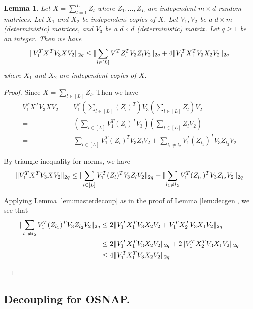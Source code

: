 \documentclass[11pt]{amsart}
\numberwithin{equation}{section}
\numberwithin{equation}{section}
\DeclarePairedDelimiter{\norm}{\lVert}{\rVert}
\newtheorem{lemma}[theorem]{Lemma}
\begin{document}
\begin{lemma}\label{decgeneral}
    Let $X=\sum \limits_{l=1}^L Z_l$ where $Z_1,...,Z_L$ are independent $m \times d$ random matrices.
 Let $X_1$ and $X_2$ be independent copies of $X$. Let $V_1,V_2$ be a $d \times m$ (deterministic) matrices, and $V_3$ be a $d \times d$ (deterministic) matrix. Let $q \ge 1$ be an integer. Then we have
    \begin{align*}
        \norm{V_1^TX^TV_3XV_2}_{2q} \le \norm{\sum \limits_{l \in [L]}V_1^TZ_{l}^TV_3Z_{l}V_2}_{2q}+4\norm{V_1^TX_1^TV_3X_2V_2}_{2q}
    \end{align*}
    where $X_1$ and $X_2$ are independent copies of $X$.
\end{lemma}

\begin{proof}
Since $X=\sum \limits_{l \in [L]}Z_l$. Then we have
\begin{align*}
    V_1^TX^TV_3XV_2=&V_1^T(\sum \limits_{l \in [L]}(Z_l)^T)V_3(\sum \limits_{l \in [L]}Z_l)V_2
    \\=&(\sum \limits_{l \in [L]}V_1^T(Z_l)^TV_3)(\sum \limits_{l \in [L]}Z_lV_2)
    \\=&\sum \limits_{l \in [L]}V_1^T(Z_l)^TV_3Z_lV_2 + \sum \limits_{l_1 \ne l_2}V_1^T(Z_{l_1})^TV_3Z_{l_2}V_2
\end{align*}

By triangle inequality for norms, we have
\begin{align*}
    \norm{V_1^TX^TV_3XV_2}_{2q} \le \norm{\sum \limits_{l \in [L]}V_1^T(Z_l)^TV_3Z_lV_2}_{2q}+ \norm{\sum \limits_{l_1 \ne l_2}V_1^T(Z_{l_1})^TV_3Z_{l_2}V_2}_{2q}
\end{align*}

Applying Lemma \ref{lem:masterdecoup} as in the proof of Lemma \ref{lem:decgen}, we see that 
\begin{align*}
\norm{\sum \limits_{l_1 \ne l_2}V_1^T(Z_{l_1})^TV_3Z_{l_2}V_2}_{2q} &\le 2\norm{V_1^TX_1^TV_3X_2V_2 + V_1^TX_2^TV_3X_1V_2}_{2q} \\
&\le 2\norm{V_1^TX_1^TV_3X_2V_2}_{2q} + 2\norm{V_1^TX_2^TV_3X_1V_2}_{2q} \\
&\le 4\norm{V_1^TX_1^TV_3X_2V_2}_{2q}
\end{align*}

\[ \]



\end{proof}

\subsection{Decoupling for OSNAP.}
\end{document}
